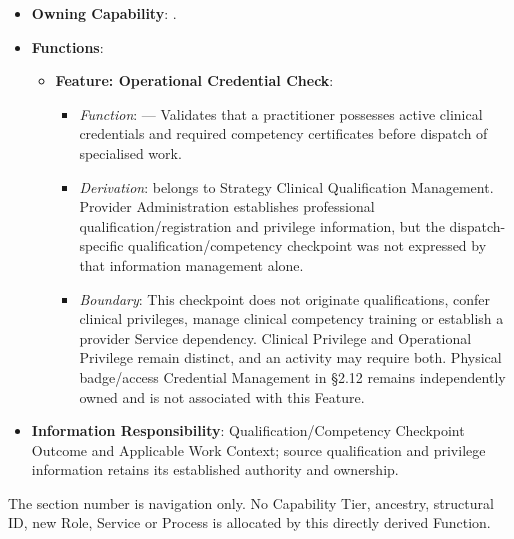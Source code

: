 \begin{itemize}

\item 
\textbf{Owning Capability}: \texttt{}.



\item 
\textbf{Functions}:


\begin{itemize}

\item 
\textbf{Feature: Operational Credential Check}:


\begin{itemize}

\item 
\emph{Function}: \texttt{} — Validates that a practitioner possesses active clinical credentials and required competency certificates before dispatch of specialised work.



\item 
\emph{Derivation}: \texttt{} belongs to Strategy Clinical Qualification Management. Provider Administration establishes professional qualification/\allowbreak{}registration and privilege information, but the dispatch-specific qualification/\allowbreak{}competency checkpoint was not expressed by that information management alone.



\item 
\emph{Boundary}: This checkpoint does not originate qualifications, confer clinical privileges, manage clinical competency training or establish a provider Service dependency. Clinical Privilege and Operational Privilege remain distinct, and an activity may require both. Physical badge/\allowbreak{}access Credential Management in §2.12 remains independently owned and is not associated with this Feature.



\end{itemize}


\end{itemize}


\item 
\textbf{Information Responsibility}: Qualification/\allowbreak{}Competency Checkpoint Outcome and Applicable Work Context; source qualification and privilege information retains its established authority and ownership.



\end{itemize}
\label{rad:hso:300}

The section number is navigation only. No Capability Tier, ancestry, structural ID, new Role, Service or Process is allocated by this directly derived Function.

